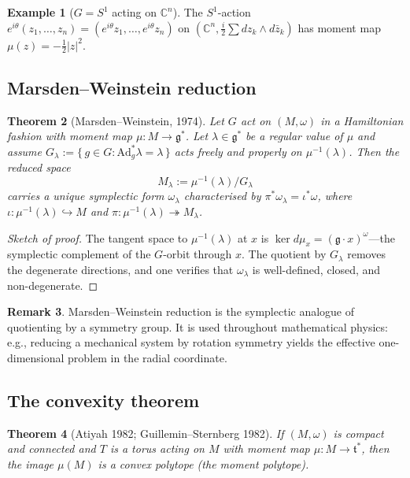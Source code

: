 \documentclass[12pt,a4paper]{amsart}
\newtheorem{theorem}{Theorem}[section]
\theoremstyle{definition}
\newtheorem{example}[theorem]{Example}
\newtheorem{remark}[theorem]{Remark}
\begin{document}
\begin{example}[$G = S^1$ acting on $\mathbb{C}^n$]
The $S^1$-action $e^{i\theta}(z_1, \ldots, z_n) = (e^{i\theta}z_1, \ldots,
e^{i\theta}z_n)$ on $(\mathbb{C}^n, \frac{i}{2}\sum dz_k \wedge d\bar{z}_k)$
has moment map $\mu(z) = -\frac{1}{2}|z|^2$.
\end{example}

\subsection{Marsden--Weinstein reduction}

\begin{theorem}[Marsden--Weinstein, 1974]\label{thm:mw}
Let $G$ act on $(M, \omega)$ in a Hamiltonian fashion with moment map
$\mu: M \to \mathfrak{g}^*$.  Let $\lambda \in \mathfrak{g}^*$ be a regular
value of $\mu$ and assume $G_\lambda := \{\,g \in G : \mathrm{Ad}^*_g \lambda
= \lambda\,\}$ acts freely and properly on $\mu^{-1}(\lambda)$.  Then the
\emph{reduced space}
\[
  M_\lambda := \mu^{-1}(\lambda) / G_\lambda
\]
carries a unique symplectic form $\omega_\lambda$ characterised by
$\pi^* \omega_\lambda = \iota^* \omega$, where $\iota: \mu^{-1}(\lambda) \hookrightarrow M$
and $\pi: \mu^{-1}(\lambda) \twoheadrightarrow M_\lambda$.
\end{theorem}

\begin{proof}[Sketch of proof]
The tangent space to $\mu^{-1}(\lambda)$ at $x$ is $\ker d\mu_x = (\mathfrak{g}
\cdot x)^{\omega}$---the symplectic complement of the $G$-orbit through $x$.
The quotient by $G_\lambda$ removes the degenerate directions, and one verifies
that $\omega_\lambda$ is well-defined, closed, and non-degenerate.
\end{proof}

\begin{remark}
Marsden--Weinstein reduction is the symplectic analogue of quotienting by a
symmetry group.  It is used throughout mathematical physics: e.g., reducing a
mechanical system by rotation symmetry yields the effective one-dimensional
problem in the radial coordinate.
\end{remark}

\subsection{The convexity theorem}

\begin{theorem}[Atiyah 1982; Guillemin--Sternberg 1982]
If $(M, \omega)$ is compact and connected and $T$ is a torus acting on $M$
with moment map $\mu: M \to \mathfrak{t}^*$, then the image $\mu(M)$ is a
convex polytope (the \emph{moment polytope}).
\end{theorem}
\end{document}
